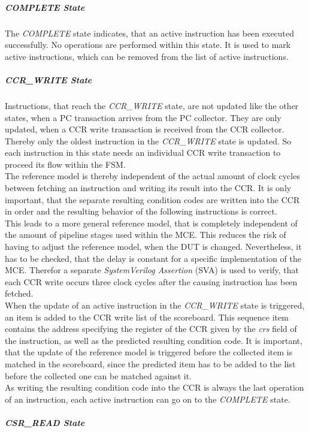 \subparagraph{COMPLETE State}

The \emph{COMPLETE} state indicates, that an active instruction has been executed successfully.
No operations are performed within this state.
It is used to mark active instructions, which can be removed from the list of active instructions.

\subparagraph{CCR\_WRITE State}

Instructions, that reach the \emph{CCR\_WRITE} state, are not updated like the other states, when a PC transaction arrives from the PC collector.
They are only updated, when a CCR write transaction is received from the CCR collector.
Thereby only the oldest instruction in the \emph{CCR\_WRITE} state is updated.
So each instruction in this state needs an individual CCR write transaction to proceed its flow within the FSM.\\
The reference model is thereby independent of the actual amount of clock cycles between fetching an instruction and writing its result into the CCR.
It is only important, that the separate resulting condition codes are written into the CCR in order and the resulting behavior of the following instructions is
correct.\\
This leads to a more general reference model, that is completely independent of the amount of pipeline stages used within the MCE.
This reduces the risk of having to adjust the reference model, when the DUT is changed.
Nevertheless, it has to be checked, that the delay is constant for a specific implementation of the MCE.
Therefor a separate \emph{SystemVerilog Assertion} (SVA) is used to verify, that each CCR write occurs three clock cycles after the causing instruction has been
fetched.\\
When the update of an active instruction in the \emph{CCR\_WRITE} state is triggered, an item is added to the CCR write list of the scoreboard.
This sequence item contains the address specifying the register of the CCR given by the \emph{crs} field of the instruction, as well as the predicted resulting
condition code.
It is important, that the update of the reference model is triggered before the collected item is matched in the scoreboard, since the predicted item has to be
added to the list before the collected one can be matched against it.\\
As writing the resulting condition code into the CCR is always the last operation of an instruction, each active instruction can go on to the \emph{COMPLETE}
state.

\subparagraph{CSR\_READ State}

